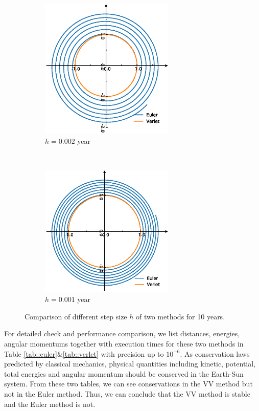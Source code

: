 \begin{figure}[tb]
\begin{subfigure}[tb]{0.5\textwidth}
		\includegraphics[width=0.7\textwidth]{Earth5000.eps}		\caption{$h = 0.002$ year}
		\label{fig:earth5000}
	\end{subfigure}
~
	\begin{subfigure}[tb]{0.5\textwidth}
		\centering
		\includegraphics[width=0.7\textwidth]{Earth10000.eps}		\caption{$h = 0.001$ year}
		\label{fig:earth10000}
	\end{subfigure}
	\caption{Comparison of different step size $h$ of two methods for 10 years. }
	\label{fig::earth}
\end{figure}

 For detailed check and performance comparison, we list distances, energies, angular momentums together with execution times for these two methods in Table \ref{tab::euler}\&\ref{tab::verlet} with precision up to $10^{-6}$.
 As conservation laws predicted by classical mechanics, physical quantities including kinetic, potential, total energies and angular momentum should be conserved in the Earth-Sun system. 
 From these two tables, we can see conservations in the VV method but not in the Euler method. 
 Thus, we can conclude that the VV method is stable and the Euler method is not.
 
